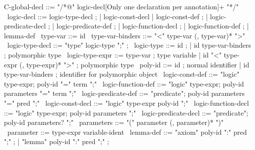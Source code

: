 \begin{syntax}
  C-global-decl ::= "/*@" logic-decl{[Only one declaration per annotation]+} "*/"
  \
  logic-decl ::= logic-type-decl ;
          | logic-const-decl | logic-const-def ;
          | logic-predicate-decl ;
          | logic-predicate-def ;
          | logic-function-decl ;
          | logic-function-def ;
          | lemma-def
  \
  type-var ::= id
  \
  type-var-binders ::= "<" type-var (, type-var)* ">"
  \
  logic-type-decl ::= "type" logic-type ";" ;
  \
  logic-type ::= id ;
  | id type-var-binders ; polymorphic type
  \
  logic-type-expr ::= type-var ; type variable
  | id "<" type-expr (, type-expr)* ">" ; polymorphic type
  \
  poly-id ::= id ; normal identifier
  | id type-var-binders ; identifier for polymorphic object
  \
  logic-const-def ::= {"logic" type-expr};
    {poly-id "=" term ";"}
  \
  logic-function-def ::= "logic" type-expr;
  poly-id parameters "=" term ";"
  \
  logic-predicate-def ::=
  "predicate";
  poly-id parameters "=" pred ";"
  \
  logic-const-decl ::= { "logic" type-expr poly-id ";"}
  \
  logic-function-decl ::=
  "logic" type-expr;
  poly-id parameters ";"
  \
  logic-predicate-decl ::=
  "predicate";
  poly-id parameters? ";"
  \
  parameters ::= "(" parameter (, parameter)* ")"
  \
  parameter ::= type-expr variable-ident
  \
  lemma-def ::= "axiom" poly-id ":" pred ";" ;
  | "lemma" poly-id ":" pred ";" ;
\end{syntax}